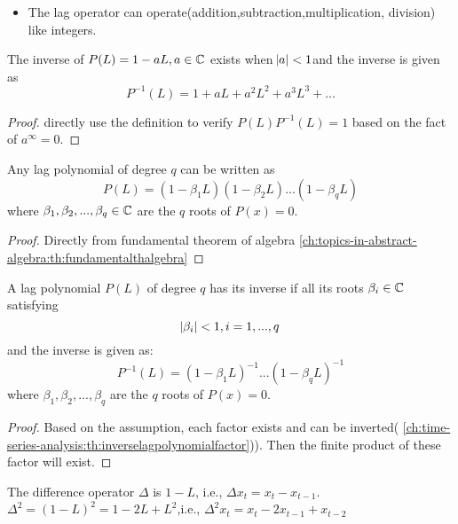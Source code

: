 \begin{remark}\hfill
\begin{itemize}
    \item The lag operator can operate(addition,subtraction,multiplication, division) like integers.
\end{itemize}
\end{remark}

\begin{lemma}\label{ch:time-series-analysis:th:inverselagpolynomialfactor}
The inverse of $P(L)=1-aL,a\in \mathbb{C}$ exists when $\abs{a}< 1$and the inverse is given as
$$ P^{-1}(L) = 1 + aL +a^2L^2 + a^3L^3 + ... $$
\end{lemma}
\begin{proof}
	directly use the definition to verify $P(L)P^{-1}(L)=1$ based on the fact of $a^\infty = 0$.
\end{proof}

\begin{lemma}
Any lag polynomial of degree $q$ can be written as
$$P(L) = (1-\beta_1 L)(1-\beta_2 L)...(1-\beta_q L)$$
where $\beta_1,\beta_2,...,\beta_q \in \mathbb{C}$ are the $q$ roots of $P(x)=0$.
\end{lemma}
\begin{proof}
Directly from fundamental theorem of algebra \autoref{ch:topics-in-abstract-algebra:th:fundamentalthalgebra}
\end{proof}


\begin{lemma}\label{ch:time-series-analysis:th:inverselagpolynomial}
A lag polynomial $P(L)$ of degree $q$ has its inverse if all its roots $\beta_i\in \mathbb{C}$ satisfying 
$$\abs{\beta_i} < 1,i=1,...,q$$
and the inverse is given as:
 $$P^{-1}(L)=(1-\beta_1 L)^{-1}...(1-\beta_q L)^{-1}$$
where $\beta_1,\beta_2,...,\beta_q$ are the $q$ roots of $P(x)=0$.
\end{lemma}
\begin{proof}
	Based on the assumption, each factor exists and can be inverted(
 \autoref{ch:time-series-analysis:th:inverselagpolynomialfactor})). Then the finite product of these factor will exist.
\end{proof}


\begin{definition}
The difference operator $\Delta$ is $1-L$, i.e., $\Delta x_t = x_t - x_{t-1}$. $\Delta^2 = (1-L)^2 = 1-2L+L^2$,i.e., $\Delta^2 x_t = x_t - 2x_{t-1} + x_{t-2}$
\end{definition}

